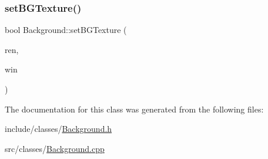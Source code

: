 \subsubsection{\texorpdfstring{set\+B\+G\+Texture()}{setBGTexture()}}
{\footnotesize\ttfamily bool Background\+::set\+B\+G\+Texture (\begin{DoxyParamCaption}\item[{S\+D\+L\+\_\+\+Renderer $\ast$}]{ren,  }\item[{S\+D\+L\+\_\+\+Window $\ast$}]{win }\end{DoxyParamCaption})}



The documentation for this class was generated from the following files\+:\begin{DoxyCompactItemize}
\item 
include/classes/\hyperlink{Background_8h}{Background.\+h}\item 
src/classes/\hyperlink{Background_8cpp}{Background.\+cpp}\end{DoxyCompactItemize}
